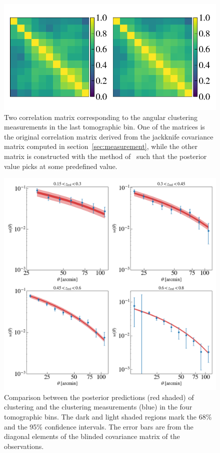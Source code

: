 \documentclass[fleqn,usenatbib,useAMS]{mnras}
\begin{document}
\begin{figure}
\includegraphics[width=\textwidth]{figures_tmp/correlation_0_6.png}
\caption{\label{fig:covariance_estimate} Two correlation matrix corresponding to the angular clustering measurements in the last tomographic bin. One of the matrices is the original correlation matrix derived from the jackknife covariance matrix computed in section~\ref{sec:measurement}, while the other matrix is constructed with the method of~\citet{sellentin2019} such that the posterior value picks at some predefined value.} 
\end{figure}

\begin{figure}
\includegraphics[width=\textwidth]{figures_tmp/w_estimate.png}
\caption{\label{fig:w_estimate} Comparison between the posterior predictions (red shaded) of clustering and the clustering measurements (blue) in the four tomographic bins. The dark and light shaded regions mark the 68\% and the 95\% confidence intervals. The error bars are from the diagonal elements of the blinded covariance matrix of the observations.} 
\end{figure}
\end{document}
